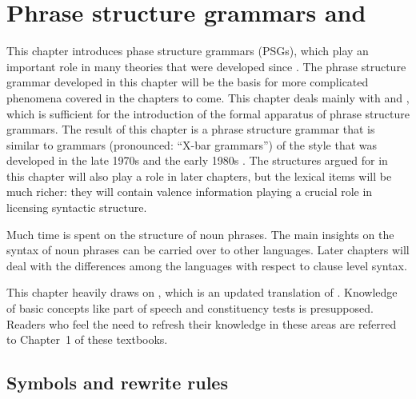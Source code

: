 \chapter{Phrase structure grammars and \xbart}
\label{chap-psg-xbar}\label{chap-psg}

This chapter introduces phase structure grammars (PSGs), which play an important role in many
theories that were developed since . The phrase structure grammar developed in
this chapter will be the basis for more complicated phenomena covered in the chapters to come. This
chapter deals mainly with  and , which is sufficient for the introduction of the formal apparatus
of phrase structure grammars. The result of this chapter is a phrase structure grammar that is
similar to \xbar grammars (pronounced: ``X-bar grammars'') of the style that was developed in the late 1970s and the early 1980s
\citep{Chomsky70a,Jackendoff77a}. The structures argued for in this chapter will also play a role in later
chapters, but the lexical items will be much richer: they will contain valence information playing a
crucial role in licensing syntactic structure.

Much time is spent on the structure of noun phrases. The main insights on the syntax of  noun
phrases can be carried over to other  languages. Later chapters will deal with the
differences among the  languages with respect to clause level syntax.

This chapter heavily draws on , which is an updated translation of
. Knowledge of basic concepts like part of speech and
constituency tests is presupposed. Readers who feel the need to refresh their knowledge in these
areas are referred to Chapter~1 of these textbooks.

\section{Symbols and rewrite rules}
\label{sec-simple-psg}

